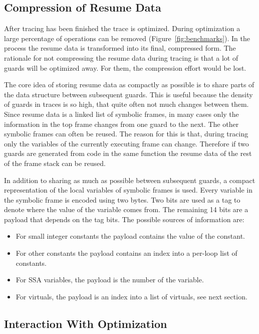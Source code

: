 \documentclass[letter,10pt]{sigplanconf}
\begin{document}
\subsection{Compression of Resume Data}
\label{sub:compression}

After tracing has been finished the trace is optimized.
During optimization a large percentage of operations can be removed (Figure~\ref{fig:benchmarks}).
In the process the resume data is transformed into its final, compressed form.
The rationale for not compressing the resume data during tracing
is that a lot of guards will be optimized away.
For them, the compression effort would be lost.

The core idea of storing resume data as compactly as possible
is to share parts of the data structure between subsequent guards.
This is useful because the density of guards in traces is so high,
that quite often not much changes between them.
Since resume data is a linked list of symbolic frames,
in many cases only the information in the top frame changes from one guard to the next.
The other symbolic frames can often be reused.
The reason for this is that, during tracing only the variables
of the currently executing frame can change.
Therefore if two guards are generated from code in the same function
the resume data of the rest of the frame stack can be reused.

In addition to sharing as much as possible between subsequent guards,
a compact representation of the local variables of symbolic frames is used.
Every variable in the symbolic frame is encoded using two bytes.
Two bits are used as a tag to denote where the value of the variable
comes from.
The remaining 14 bits are a payload that depends on the tag bits.
The possible sources of information are:

\begin{itemize}
    \item For small integer constants
        the payload contains the value of the constant.
    \item For other constants
        the payload contains an index into a per-loop list of constants.
    \item For SSA variables,
        the payload is the number of the variable.
    \item For virtuals,
        the payload is an index into a list of virtuals, see next section.
\end{itemize}

\subsection{Interaction With Optimization}
\label{sub:optimization}
\end{document}
